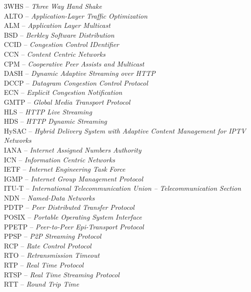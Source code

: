 3WHS		-- \textit{Three Way Hand Shake}\\
ALTO		-- \textit{Application-Layer Traffic Optimization}\\
ALM		-- \textit{Application Layer Multicast}\\
BSD		-- \textit{Berkley Software Distribution}\\
CCID		-- \textit{Congestion Control IDentifier}\\
CCN		-- \textit{Content Centric Networks}\\
CPM		-- \textit{Cooperative Peer Assists and Multicast}\\
DASH		-- \textit{Dynamic Adaptive Streaming over HTTP}\\
DCCP		-- \textit{Datagram Congestion Control Protocol}\\
ECN		-- \textit{Explicit Congestion Notification}\\
GMTP		-- \textit{Global Media Transport Protocol}\\
HLS		-- \textit{HTTP Live Streaming}\\
HDS		-- \textit{HTTP Dynamic Streaming}\\
HySAC		-- \textit{Hybrid Delivery System with Adaptive Content Management
for IPTV Networks}\\
IANA		-- \textit{Internet Assigned Numbers Authority}\\
ICN		-- \textit{Information Centric Networks}\\
IETF		-- \textit{Internet Engineering Task Force}\\
IGMP		-- \textit{Internet Group Management Protocol}\\
ITU-T		-- \textit{International Telecommunication Union --
Telecommunication Section}\\
NDN		-- \textit{Named-Data Networks}\\
PDTP		-- \textit{Peer Distributed Transfer Protocol}\\
POSIX		-- \textit{Portable Operating System Interface}\\
PPETP		-- \textit{Peer-to-Peer Epi-Transport Protocol}\\
PPSP		-- \textit{P2P Streaming Protocol}\\
RCP		-- \textit{Rate Control Protocol}\\
RTO		-- \textit{Retransmission Timeout}\\
RTP		-- \textit{Real Time Protocol}\\
RTSP		-- \textit{Real Time Streaming Protocol}\\
RTT		-- \textit{Round Trip Time}\\
